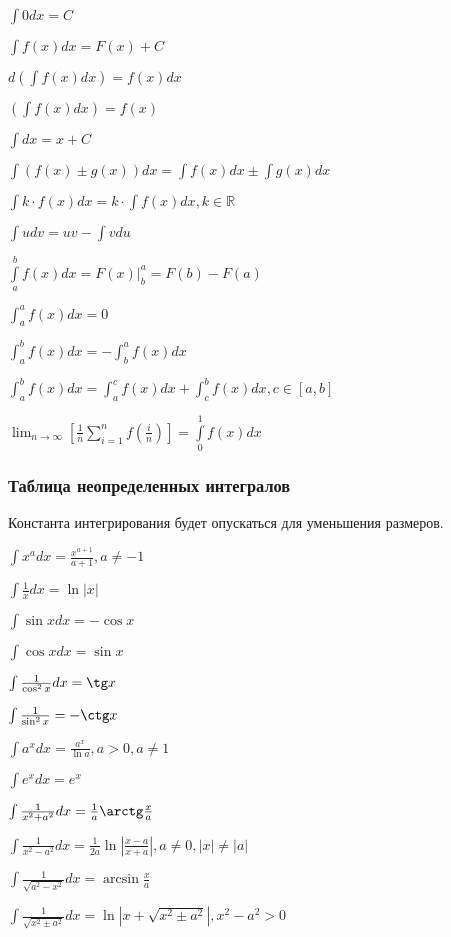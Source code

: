 $ \int 0 dx = C $

$ \int f(x) dx = F(x) + C $

$ d(\int f(x) dx) = f(x) dx $

$ \left(\int f(x) dx \right) = f(x) $

$ \int dx = x + C $

$ \int (f(x) \pm g(x)) dx = \int f(x) dx \pm \int g(x) dx $

$ \int k\cdot f(x) dx = k\cdot \int f(x) dx, k \in \mathbb{R} $

$ \int u dv = uv - \int v du $

$ \int\limits_a^b f(x) dx = \left.F(x)\right|_b^a = F(b) - F(a) $

$ \int_a^a f(x) dx = 0 $

$ \int_a^b f(x) dx = -\int_b^a f(x) dx $

$ \int_a^b f(x) dx = \int_a^c f(x) dx + \int_c^b f(x) dx, c \in [a, b] $

$\displaystyle \lim_{n \to \infty} \left[ \frac{1}{n} \sum_{i = 1}^{n} f\left(\frac{i}{n}\right) \right] = \int\limits_0^1 f(x) dx $

\subsubsection{Таблица неопределенных интегралов}

Константа интегрирования будет опускаться для уменьшения размеров.

$ \int x^a dx = \frac{x^{a+1}}{a+1}, a \neq -1 $

$ \int \frac{1}{x} dx = \ln|x| $

$ \int \sin x dx = -\cos x $

$ \int \cos x dx = \sin x $

$ \int \frac{1}{\cos^2 x} dx = \tg x $

$ \int \frac{1}{\sin^2 x} = -\ctg x $

$ \int a^x dx = \frac{a^x}{\ln a}, a>0, a \neq 1 $

$ \int e^x dx = e^x $

$ \int \frac{1}{x^2 + a^2} dx = \frac{1}{a} \arctg\frac{x}{a} $

$ \int \frac{1}{x^2 - a^2} dx = \frac{1}{2a} \ln\left|\frac{x-a}{x+a}\right|, a \neq 0, |x| \neq |a| $

$ \int \frac{1}{\sqrt{a^2-x^2}} dx = \arcsin\frac{x}{a} $

$ \int \frac{1}{\sqrt{x^2\pm a^2}} dx = \ln\left|x+\sqrt{x^2\pm a^2}\right|, x^2-a^2 > 0 $

